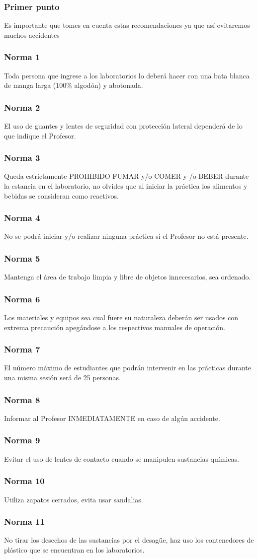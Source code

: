 \documentclass[14pt]{beamer}
\begin{document}
\begin{frame}
\frametitle{Primer punto}
Es importante que tomes en cuenta estas recomendaciones ya que así evitaremos muchos accidentes
\end{frame}
\begin{frame}
\frametitle{Norma 1}
Toda persona que ingrese a los laboratorios lo deberá hacer con una bata blanca de manga larga (100\% algodón) y abotonada.
\end{frame}
\begin{frame}
\frametitle{Norma 2}
El uso de guantes y lentes de seguridad con protección lateral dependerá de lo que indique el Profesor.
\end{frame}
\begin{frame}
\frametitle{Norma 3}
Queda estrictamente PROHIBIDO FUMAR y/o COMER y /o BEBER durante la estancia en el laboratorio, \pause no olvides que al iniciar la práctica los alimentos y bebidas se consideran como reactivos.
\end{frame}
\begin{frame}
\frametitle{Norma 4}
No se podrá iniciar y/o realizar ninguna práctica si el Profesor no está presente.
\end{frame}
\begin{frame}
\frametitle{Norma 5}
Mantenga el área de trabajo limpia y libre de objetos innecesarios, sea ordenado.
\end{frame}
\begin{frame}
\frametitle{Norma 6}
Los materiales y equipos sea cual fuere su naturaleza deberán ser usados con extrema precaución apegándose a los respectivos manuales de operación.
\end{frame}
\begin{frame}
\frametitle{Norma 7}
El número máximo de estudiantes que podrán intervenir en las prácticas durante una misma sesión será de 25 personas.
\end{frame}
\begin{frame}
\frametitle{Norma 8}
Informar al Profesor INMEDIATAMENTE en caso de algún accidente.
\end{frame}
\begin{frame}
\frametitle{Norma 9}
Evitar el uso de lentes de contacto cuando se manipulen sustancias químicas.
\end{frame}
\begin{frame}
\frametitle{Norma 10}
Utiliza zapatos cerrados, evita usar sandalias.
\end{frame}
\begin{frame}
\frametitle{Norma 11}
No tirar los desechos de las sustancias por el desagüe, haz uso los contenedores de plástico que se encuentran en los laboratorios.
\end{frame}
\end{document}
